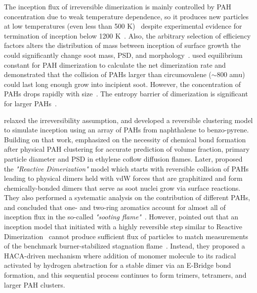  

The inception flux of irreversible dimerization is mainly controlled by PAH concentration due to weak temperature dependence, so it produces new particles at low temperatures (even less than 500 K)~\citep{naseri2022simulating} despite experimental evidence for termination of inception below 1200 K~\citep{sanchez2012polycyclic, cho2016synthesis}. Also, the arbitrary selection of efficiency factors alters the distribution of mass between inception of surface growth the could significantly change soot mass, PSD, and morphology~\citep{saffaripour2014experimental}. \citet{miller1991kinetics} used equilibrium constant for PAH dimerization to calculate the net dimerization rate and demonstrated that the collision of PAHs larger than circumovalene ($\sim$800 amu) could last long enough grow into incipient soot. However, the concentration of PAHs drops rapidly with size~\citep{Wang2011}. The entropy barrier of dimerization is significant for larger PAHs~\citep{giordana2011theoretical}.  


\citet{eaves2015importance} relaxed the irreversibility assumption, and developed a reversible clustering model to simulate inception using an array of PAHs from naphthalene to benzo-pyrene. Building on that work, \citet{kholghy2019role} emphasized on the necessity of chemical bond formation after physical PAH clustering for accurate prediction of volume fraction, primary particle diameter and PSD in ethylene coflow diffusion flames. Later, \citet{kholghy2018reactive} proposed the \textit{"Reactive Dimerization"} model which starts with reversible collision of PAHs leading to physical dimers held with vdW forces that are graphitized and form chemically-bonded dimers that serve as soot nuclei grow via surface reactions. They also performed a systematic analysis on the contribution of different PAHs, and concluded that one- and two-ring aromatics account for almost all of inception flux in the so-called \textit{"sooting flame"}~\citep{desgroux2017comparative}. However, \citet{frenklach2020mechanism} pointed out that an inception model that initiated with a highly reversible step similar to Reactive Dimerization~\citep{kholghy2018reactive} cannot produce sufficient flux of particles to match measurements of the benchmark burner-stabilized stagnation flame~\citep{abid2009quantitative}. Instead, they proposed a HACA-driven mechanism where addition of monomer molecule to its radical activated by hydrogen abstraction for a stable dimer via an E-Bridge bond formation, and this sequential process continues to form trimers, tetramers, and larger PAH clusters.

